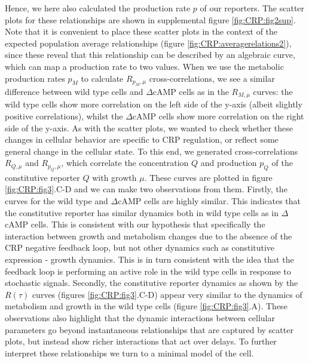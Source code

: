 %
Hence, we here also calculated the production rate $p$ of our reporters.
%
The scatter plots for these relationships are shown in supplemental figure \ref{fig:CRP:fig2sup}.
%
Note that it is convenient to place these scatter plots in the context of the expected population average relationships (figure \ref{fig:CRP:averagerelations2}), 
since these reveal that this relationship can be described by an algebraic curve, 
which can map a production rate to two values.
%
When we use the metabolic production rates $p_M$ to calculate $R_{p_M,\mu}$ cross-correlations, we see a similar difference between wild type cells and $\Delta$cAMP cells as in the $R_{M,\mu}$ curves:
the wild type cells show more correlation on the left side of the y-axis (albeit slightly positive correlations), whilst the $\Delta$cAMP cells show more correlation on the right side of the y-axis.
%
As with the scatter plots, we wanted to check whether these changes in cellular behavior are specific to CRP regulation,
or reflect some general change in the cellular state.
%
To this end, we generated cross-correlations $R_{Q,\mu}$ and $R_{p_Q,\mu}$, which correlate the concentration $Q$ and production $p_Q$ of the constitutive reporter $Q$ with growth $\mu$.
%
These curves are plotted in figure \ref{fig:CRP:fig3}.C-D and we can make two observations from them.
Firstly, the curves for the wild type and $\Delta$cAMP cells are highly similar.
%
This indicates that the constitutive reporter has similar dynamics both in wild type cells as in $\Delta$cAMP cells.
%
This is consistent with our hypothesis that specifically the interaction between growth and metabolism changes due to the absence of the CRP negative feedback loop, 
but not other dynamics such as constitutive expression - growth dynamics.
%
This is in turn consistent with the idea that the feedback loop is performing an active role in the wild type cells in response to stochastic signals.
%
Secondly, the constitutive reporter dynamics as shown by the $R(\tau)$ curves (figures \ref{fig:CRP:fig3}.C-D) appear very similar to the dynamics of metabolism and growth in the wild type cells (figure \ref{fig:CRP:fig3}.A).
%
These observations also highlight that the dynamic interactions between cellular parameters go beyond instantaneous relationships that are captured by scatter plots, but instead show richer interactions that act over delays. 
To further interpret these relationships we turn to a minimal model of the cell.


